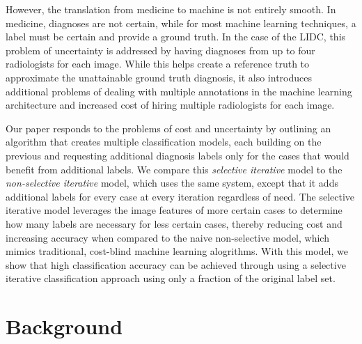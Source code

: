 \documentclass[]{spie}
\begin{document}
However, the translation from medicine to machine is not entirely smooth. In medicine, diagnoses are not certain, while for most machine learning techniques, a label must be certain and provide a ground truth. In the case of the LIDC, this problem of uncertainty is addressed by having diagnoses from up to four radiologists for each image. While this helps create a reference truth to approximate the unattainable ground truth diagnosis, it also introduces additional problems of dealing with multiple annotations in the machine learning architecture and increased cost of hiring multiple radiologists for each image. 

Our paper responds to the problems of cost and uncertainty by outlining an algorithm that creates multiple classification models, each building on the previous and requesting additional diagnosis labels only for the cases that would benefit from additional labels. We compare this \textit{selective iterative} model to the \textit{non-selective iterative} model, which uses the same system, except that it adds additional labels for every case at every iteration regardless of need. The selective iterative model leverages the image features of more certain cases to determine how many labels are necessary for less certain cases, thereby reducing cost and increasing accuracy when compared to the naive non-selective model, which mimics traditional, cost-blind machine learning alogrithms. With this model, we show that high classification accuracy can be achieved through using a selective iterative classification approach using only a fraction of the original label set.


\section{Background}
\label{sec:background}
\end{document}
